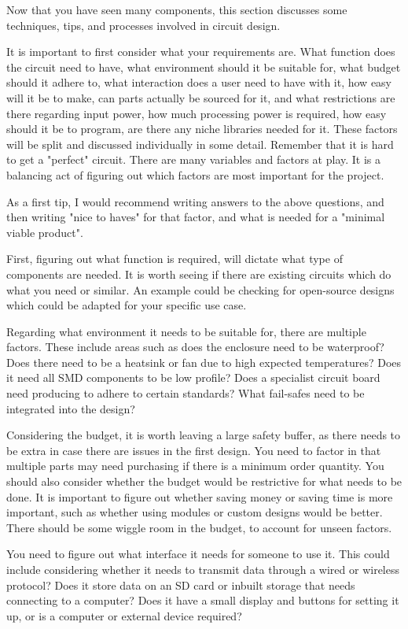 \documentclass[a4paper,11pt]{report}
\begin{document}
Now that you have seen many components, this section discusses some techniques, tips, and processes involved in circuit design.

It is important to first consider what your requirements are. What function does the circuit need to have, what environment should it be suitable for, what budget should it adhere to, what interaction does a user need to have with it, how easy will it be to make, can parts actually be sourced for it, and what restrictions are there regarding input power, how much processing power is required, how easy should it be to program, are there any niche libraries needed for it. These factors will be split and discussed individually in some detail. Remember that it is hard to get a "perfect" circuit. There are many variables and factors at play. It is a balancing act of figuring out which factors are most important for the project.

As a first tip, I would recommend writing answers to the above questions, and then writing "nice to haves" for that factor, and what is needed for a "minimal viable product".

First, figuring out what function is required, will dictate what type of components are needed. It is worth seeing if there are existing circuits which do what you need or similar. An example could be checking for open-source designs which could be adapted for your specific use case.

Regarding what environment it needs to be suitable for, there are multiple factors. These include areas such as does the enclosure need to be waterproof? Does there need to be a heatsink or fan due to high expected temperatures? Does it need all SMD components to be low profile? Does a specialist circuit board need producing to adhere to certain standards? What fail-safes need to be integrated into the design?

Considering the budget, it is worth leaving a large safety buffer, as there needs to be extra in case there are issues in the first design. You need to factor in that multiple parts may need purchasing if there is a minimum order quantity. You should also consider whether the budget would be restrictive for what needs to be done. It is important to figure out whether saving money or saving time is more important, such as whether using modules or custom designs would be better. There should be some wiggle room in the budget, to account for unseen factors.

You need to figure out what interface it needs for someone to use it. This could include considering whether it needs to transmit data through a wired or wireless protocol? Does it store data on an SD card or inbuilt storage that needs connecting to a computer? Does it have a small display and buttons for setting it up, or is a computer or external device required?
\end{document}
